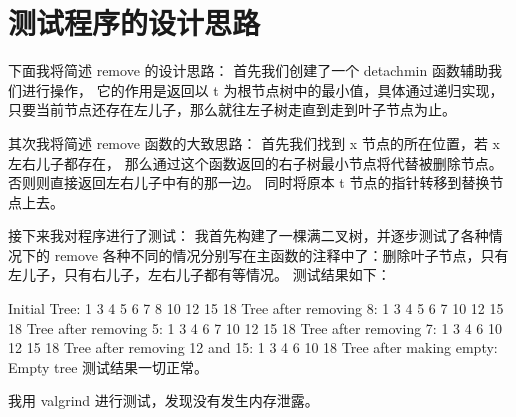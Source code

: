 \documentclass[UTF8]{ctexart}
\begin{document}
\pagestyle{fancy}
\fancyhead{}

\section{测试程序的设计思路}

下面我将简述 remove 的设计思路：
首先我们创建了一个 detachmin 函数辅助我们进行操作，
它的作用是返回以 t 为根节点树中的最小值，具体通过递归实现，
只要当前节点还存在左儿子，那么就往左子树走直到走到叶子节点为止。

其次我将简述 remove 函数的大致思路：
首先我们找到 x 节点的所在位置，若 x 左右儿子都存在，
那么通过这个函数返回的右子树最小节点将代替被删除节点。
否则则直接返回左右儿子中有的那一边。
同时将原本 t 节点的指针转移到替换节点上去。

接下来我对程序进行了测试：
我首先构建了一棵满二叉树，并逐步测试了各种情况下的 remove 
各种不同的情况分别写在主函数的注释中了：删除叶子节点，只有左儿子，只有右儿子，左右儿子都有等情况。
测试结果如下：

Initial Tree:
1
3
4
5
6
7
8
10
12
15
18
Tree after removing 8:
1
3
4
5
6
7
10
12
15
18
Tree after removing 5:
1
3
4
6
7
10
12
15
18
Tree after removing 7:
1
3
4
6
10
12
15
18
Tree after removing 12 and 15:
1
3
4
6
10
18
Tree after making empty:
Empty tree
测试结果一切正常。

我用 valgrind 进行测试，发现没有发生内存泄露。
\end{document}
